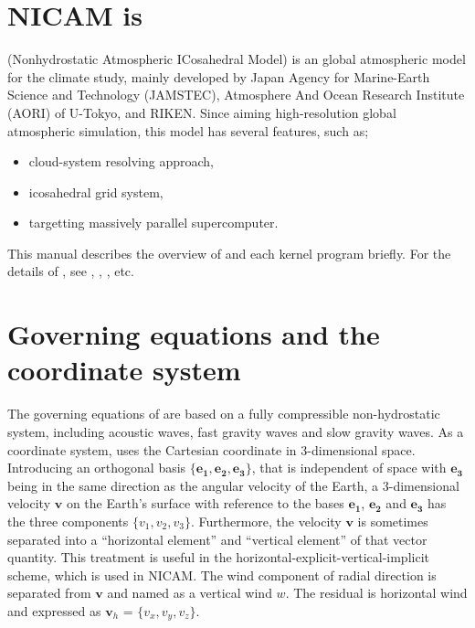 
\section{NICAM is}

\NICAM (Nonhydrostatic Atmospheric ICosahedral Model) is an global
atmospheric model for the climate study, mainly developed by Japan Agency for Marine-Earth
Science and Technology (JAMSTEC), Atmosphere And Ocean Research Institute (AORI) of
U-Tokyo, and RIKEN.
Since aiming high-resolution global atmospheric simulation, this model has several features, such as;

\begin{itemize}
 \item cloud-system resolving approach,
 \item icosahedral grid system,
 \item targetting massively parallel supercomputer.
\end{itemize}

This manual describes the overview of \NICAM and each kernel program briefly.
For the details of \NICAM , see
\cite{Tomita:2004kf},
\cite{Satoh:2008fb},
\cite{Satoh:2014dm},
 etc.

\section{Governing equations and the coordinate system}


The governing equations of \NICAM are based on a fully compressible
non-hydrostatic system, including acoustic waves, fast gravity waves and
slow gravity waves.
%
As a coordinate system, \NICAM uses the Cartesian coordinate in
3-dimensional space.
%
Introducing an orthogonal basis $\{\bm{e_1}, \bm{e_2}, \bm{e_3}\}$, that
is independent of space with $\bm{e_3}$ being in the same direction as
the angular velocity of the Earth, a 3-dimensional velocity $\bm{v}$ on the Earth's surface
with reference to the bases $\bm{e_1}$, $\bm{e_2}$ and $\bm{e_3}$ has
the three components $\{v_1, v_2, v_3\}$.
%
Furthermore, the velocity $\bm{v}$ is sometimes separated into a ``horizontal element''
and ``vertical element'' of that vector quantity.
This treatment is useful in the horizontal-explicit-vertical-implicit scheme, which is used in NICAM.
The wind component of radial direction is separated from $\bm{v}$ and named as a vertical wind $w$.
The residual is horizontal wind and expressed as $\bm{v}_h$ = $\{v_x, v_y, v_z\}$.

